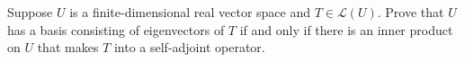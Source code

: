 \documentclass[12pt,letterpaper,boxed]{hmcpset}
\begin{document}
\begin{solution}
\end{solution}

\clearpage

\begin{problem}[14]
Suppose $U$ is a finite-dimensional real vector space and $ T \in \mathcal{L}(U) $. Prove that $U$ has a basis consisting of eigenvectors of $T$ if and only if there is an inner product on $U$ that makes $T$ into a self-adjoint operator. 
\end{problem}

\begin{solution}

\end{solution}
\end{document}
